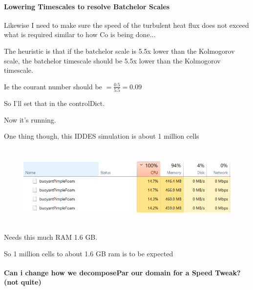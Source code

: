 \documentclass[12pt]{article}
\renewcommand{\_}{\kern-1.5pt\textunderscore\kern-1.5pt}
\begin{document}
\paragraph{Lowering Timescales to resolve Batchelor Scales}
Likewise I need to make sure the speed of the turbulent heat flux does not exceed what is required similar to how Co is being done$ \ldots $ \par

The heuristic is that if the batchelor scale is 5.5x lower than the Kolmogorov scale, the batchelor timescale should be 5.5x lower than the Kolmogorov timescale.\par

Ie the courant number should be  \( =\frac{0.5}{5.5}=0.09 \) \par

So I’ll set that in the controlDict.\par

Now it’s running.\par

One thing though, this IDDES simulation is about 1 million cells \par




\begin{figure}[H]
	\begin{Center}
		\includegraphics[width=6.27in,height=1.61in]{./media/image23.png}
	\end{Center}
\end{figure}



\par

Needs this much RAM  1.6 GB.\par

So 1 million cells to about 1.6 GB ram is to be expected\par

\paragraph{Can i change how we decomposePar our domain for a Speed Tweak? (not quite)}\par
\end{document}
